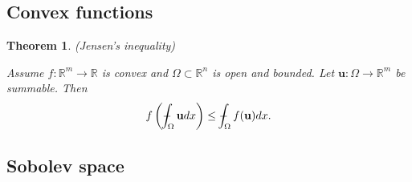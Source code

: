 \documentclass[11pt,a4paper]{report}
\newtheorem{theorem}{Theorem}[section]
\theoremstyle{definition}
\def\Xint#1{\mathchoice
{\XXint\displaystyle\textstyle{#1}}%
{\XXint\textstyle\scriptstyle{#1}}%
{\XXint\scriptstyle\scriptscriptstyle{#1}}%
{\XXint\scriptscriptstyle\scriptscriptstyle{#1}}%
\!\int}
\def\XXint#1#2#3{{\setbox0=\hbox{$#1{#2#3}{\int}$}
\vcenter{\hbox{$#2#3$}}\kern-.5\wd0}}
\def\dashint{\Xint-}
\begin{document}
\subsection{Convex functions}

\begin{theorem}
	\emph{(Jensen's inequality)}

	Assume $f: \mathbb{R}^m \rightarrow \mathbb{R}$ is convex and $\Omega \subset \mathbb{R}^n$ is open and bounded. 
	Let $\mathbf{u}: \Omega \rightarrow \mathbb{R}^m$ be summable. 
	Then
	\begin{equation*} 
		f\left(\dashint_{\Omega} \mathbf{u} d x \right) \leq \dashint_{\Omega} f(\mathbf{u}) dx.
	\end{equation*}
\end{theorem}

\subsection{Sobolev space}
\end{document}
